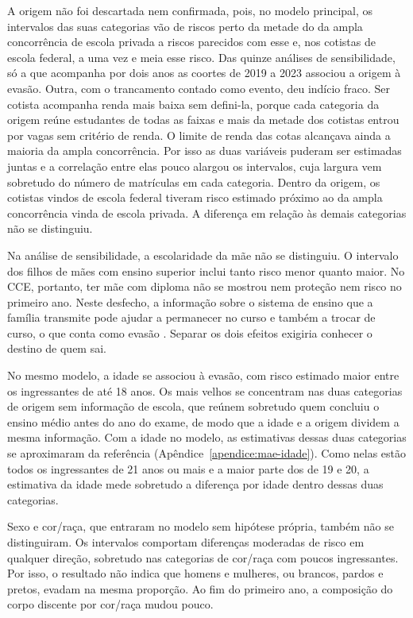 \documentclass[12pt,a4paper]{article}
\begin{document}
A origem não foi descartada nem confirmada, pois, no modelo principal, os intervalos das suas categorias vão de riscos perto da metade do da ampla concorrência de escola privada a riscos parecidos com esse e, nos cotistas de escola federal, a uma vez e meia esse risco. Das quinze análises de sensibilidade, só a que acompanha por dois anos as coortes de 2019 a 2023 associou a origem à evasão. Outra, com o trancamento contado como evento, deu indício fraco. Ser cotista acompanha renda mais baixa sem defini-la, porque cada categoria da origem reúne estudantes de todas as faixas e mais da metade dos cotistas entrou por vagas sem critério de renda. O limite de renda das cotas alcançava ainda a maioria da ampla concorrência. Por isso as duas variáveis puderam ser estimadas juntas e a correlação entre elas pouco alargou os intervalos, cuja largura vem sobretudo do número de matrículas em cada categoria. Dentro da origem, os cotistas vindos de escola federal tiveram risco estimado próximo ao da ampla concorrência vinda de escola privada. A diferença em relação às demais categorias não se distinguiu.

Na análise de sensibilidade, a escolaridade da mãe não se distinguiu. O intervalo dos filhos de mães com ensino superior inclui tanto risco menor quanto maior. No CCE, portanto, ter mãe com diploma não se mostrou nem proteção nem risco no primeiro ano. Neste desfecho, a informação sobre o sistema de ensino que a família transmite pode ajudar a permanecer no curso e também a trocar de curso, o que conta como evasão \citep{nogueira2002sociologia}. Separar os dois efeitos exigiria conhecer o destino de quem sai.

No mesmo modelo, a idade se associou à evasão, com risco estimado maior entre os ingressantes de até 18 anos. Os mais velhos se concentram nas duas categorias de origem sem informação de escola, que reúnem sobretudo quem concluiu o ensino médio antes do ano do exame, de modo que a idade e a origem dividem a mesma informação. Com a idade no modelo, as estimativas dessas duas categorias se aproximaram da referência (Apêndice~\ref{apendice:mae-idade}). Como nelas estão todos os ingressantes de 21 anos ou mais e a maior parte dos de 19 e 20, a estimativa da idade mede sobretudo a diferença por idade dentro dessas duas categorias.

Sexo e cor/raça, que entraram no modelo sem hipótese própria, também não se distinguiram. Os intervalos comportam diferenças moderadas de risco em qualquer direção, sobretudo nas categorias de cor/raça com poucos ingressantes. Por isso, o resultado não indica que homens e mulheres, ou brancos, pardos e pretos, evadam na mesma proporção. Ao fim do primeiro ano, a composição do corpo discente por cor/raça mudou pouco.
\end{document}
